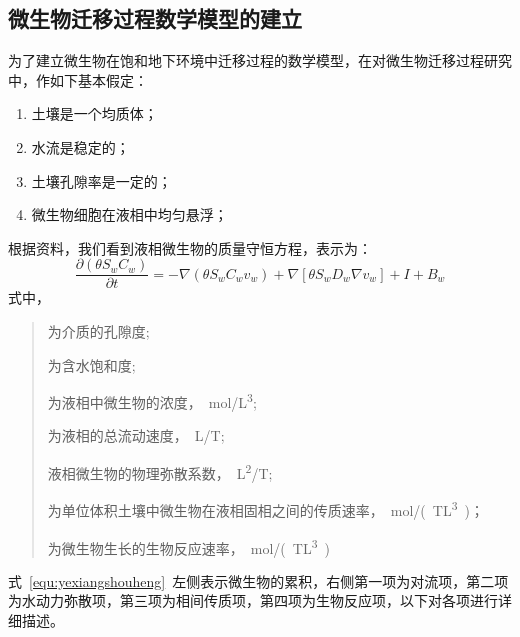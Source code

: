 \documentclass[a4paper,cs4size,adobefonts,fancyhdr]{ctexart}[2005/11/25]
\numberwithin{equation}{section} %
\begin{document}
\subsection{微生物迁移过程数学模型的建立}
为了建立微生物在饱和地下环境中迁移过程的数学模型，在对微生物迁移过程研究中，作如下基本假定：
\begin{enumerate}\setlength{\itemsep}{0em}
\item 土壤是一个均质体； 
\item 水流是稳定的； 
\item 土壤孔隙率是一定的； 
\item 微生物细胞在液相中均匀悬浮； 
\end{enumerate}\par
根据资料，我们看到液相微生物的质量守恒方程，表示为：
\begin{equation}\label{equ:yexiangshouheng}
\dfrac{\partial(\theta S_w C_w)}{\partial t}
=-\nabla(\theta S_w C_w v_w)+\nabla[\theta S_wD_w\nabla v_w]+I+B_w
\end{equation}
式中，
	\begin{quote}
	\begin{description}\setlength{\itemsep}{0em}
	\item[$\theta$]为介质的孔隙度;
	\item[$S_w$]为含水饱和度;
	\item[$C_w$]为液相中微生物的浓度，\SI{}{mol/L^3};
	\item[$V_w$]为液相的总流动速度，\SI{}{L/T};
	\item[$D_w$]液相微生物的物理弥散系数，\SI{}{L^2/T};
	\item[$I$]为单位体积土壤中微生物在液相固相之间的传质速率，\SI{}{mol/(TL^3)}；
	\item[$B_w$]为微生物生长的生物反应速率，\SI{}{mol/(TL^3)}
	\end{description}
	\end{quote}\par
式~\ref{equ:yexiangshouheng}~左侧表示微生物的累积，右侧第一项为对流项，第二项为水动力弥散项，第三项为相间传质项，第四项为生物反应项，以下对各项进行详细描述。
\end{document}
